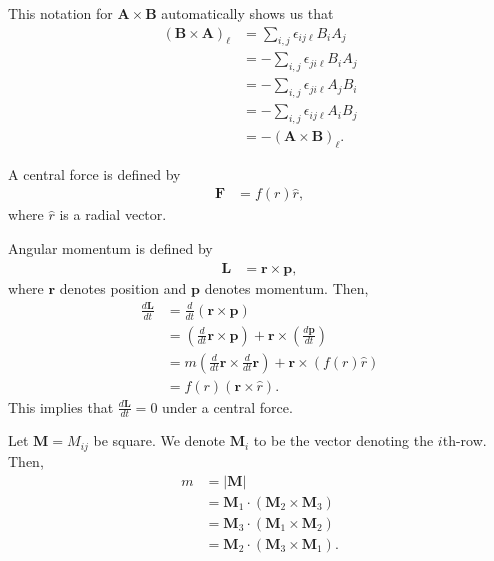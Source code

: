 \documentclass[10pt]{mypackage}
\begin{document}
\begin{remark}
  This notation for $\mathbf{A}\times \mathbf{B}$ automatically shows us that
  \begin{align*}
    \left(\mathbf{B}\times \mathbf{A}\right)_{\ell} &= \sum_{i,j}\epsilon_{ij\ell}B_iA_j\\
                                                    &= -\sum_{i,j}\epsilon_{ji\ell}B_iA_j\\
                                                    &= -\sum_{i,j}\epsilon_{ji\ell}A_jB_i\\
                                                    &= -\sum_{i,j}\epsilon_{ij\ell}A_iB_j\tag*{$i,j$ are dummy indices}\\
                                                    &= -\left(\mathbf{A}\times \mathbf{B}\right)_{\ell}.
  \end{align*}
\end{remark}
\begin{example}
  A central force is defined by
  \begin{align*}
    \mathbf{F} &= f(r)\widehat{r},
  \end{align*}
  where $\widehat{r}$ is a radial vector.\newline

  Angular momentum is defined by
  \begin{align*}
    \mathbf{L} &= \mathbf{r}\times \mathbf{p},
  \end{align*}
  where $\mathbf{r}$ denotes position and $\mathbf{p}$ denotes momentum. Then,
  \begin{align*}
    \frac{d\mathbf{L}}{dt} &= \frac{d}{dt}\left(\mathbf{r}\times \mathbf{p}\right)\\
                           &= \left(\frac{d}{dt}\mathbf{r}\times \mathbf{p}\right) + \mathbf{r}\times \left(\frac{d\mathbf{p}}{dt}\right)\\
                           &= m\left(\frac{d}{dt}\mathbf{r}\times \frac{d}{dt}\mathbf{r}\right) + \mathbf{r}\times \left(f(r)\widehat{r}\right)\\
                           &= f(r)\left(\mathbf{r}\times \widehat{r}\right).
  \end{align*}
  This implies that $\frac{d\mathbf{L}}{dt} = 0$ under a central force.
\end{example}
\begin{example}[Determinant]
  Let $\mathbf{M} = M_{ij}$ be square. We denote $\mathbf{M}_i$ to be the vector denoting the $i$th-row. Then,
  \begin{align*}
    m &= \left\vert \mathbf{M} \right\vert\\
      &= \mathbf{M}_1\cdot \left(\mathbf{M}_2 \times \mathbf{M}_3\right)\\
      &= \mathbf{M}_3 \cdot \left(\mathbf{M}_1\times \mathbf{M}_2\right)\\
      &= \mathbf{M}_2 \cdot \left(\mathbf{M}_3\times \mathbf{M}_1\right).
  \end{align*}
\end{example}
\end{document}
